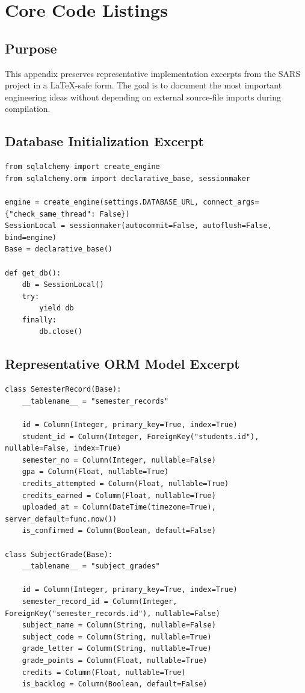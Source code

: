 \chapter{Core Code Listings}

\section{Purpose}
This appendix preserves representative implementation excerpts from the SARS project in a LaTeX-safe form. The goal is to document the most important engineering ideas without depending on external source-file imports during compilation.

\section{Database Initialization Excerpt}
\begin{lstlisting}[style=sarscode,caption={Representative backend database setup excerpt}]
from sqlalchemy import create_engine
from sqlalchemy.orm import declarative_base, sessionmaker

engine = create_engine(settings.DATABASE_URL, connect_args={"check_same_thread": False})
SessionLocal = sessionmaker(autocommit=False, autoflush=False, bind=engine)
Base = declarative_base()

def get_db():
    db = SessionLocal()
    try:
        yield db
    finally:
        db.close()
\end{lstlisting}

\section{Representative ORM Model Excerpt}
\begin{lstlisting}[style=sarscode,caption={Representative academic ORM model excerpt}]
class SemesterRecord(Base):
    __tablename__ = "semester_records"

    id = Column(Integer, primary_key=True, index=True)
    student_id = Column(Integer, ForeignKey("students.id"), nullable=False, index=True)
    semester_no = Column(Integer, nullable=False)
    gpa = Column(Float, nullable=True)
    credits_attempted = Column(Float, nullable=True)
    credits_earned = Column(Float, nullable=True)
    uploaded_at = Column(DateTime(timezone=True), server_default=func.now())
    is_confirmed = Column(Boolean, default=False)

class SubjectGrade(Base):
    __tablename__ = "subject_grades"

    id = Column(Integer, primary_key=True, index=True)
    semester_record_id = Column(Integer, ForeignKey("semester_records.id"), nullable=False)
    subject_name = Column(String, nullable=False)
    subject_code = Column(String, nullable=True)
    grade_letter = Column(String, nullable=True)
    grade_points = Column(Float, nullable=True)
    credits = Column(Float, nullable=True)
    is_backlog = Column(Boolean, default=False)
\end{lstlisting}

